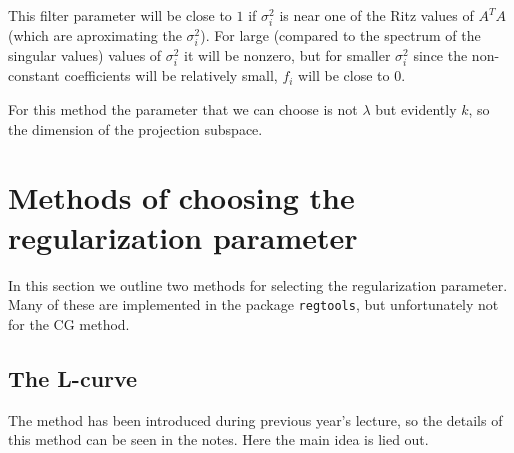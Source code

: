 \documentclass{article}
\begin{document}
	This filter parameter will be close to $1$ if $\sigma_i^2$ is near one of the Ritz values of $A^T A$ (which are aproximating the $\sigma_i^2$). For large (compared to the spectrum of the singular values) values of $\sigma_i^2$ it will be nonzero, but for smaller $\sigma_i^2$ since the non-constant coefficients will be relatively small, $f_i$ will be close to 0.
	
	For this method the parameter that we can choose is not $\lambda$ but evidently $k$, so the dimension of the projection subspace.
	
	\section{Methods of choosing the regularization parameter}
	In this section we outline two methods for selecting the regularization parameter. Many of these are implemented in the package \texttt{regtools}, but unfortunately not for the CG method.
	
	\subsection{The L-curve}
	
	The method has been introduced during previous year's lecture, so the details of this method can be seen in the notes. Here the main idea is lied out. 
	
\end{document}
